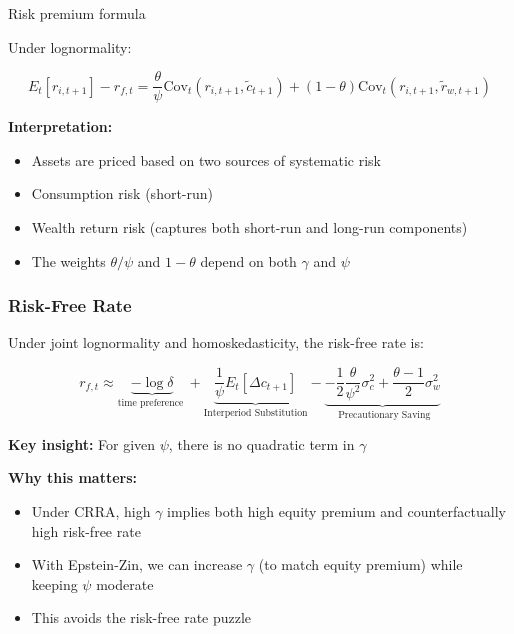 \documentclass{beamer}
\begin{document}
\begin{frame}{Risk premium formula}
    
    Under lognormality:
    \begin{tcolorbox}[colback=red!5!white, colframe=red!75!black]
        \begin{equation*}
        E_t[r_{i,t+1}] - r_{f,t} = \frac{\theta}{\psi} \text{Cov}_t(r_{i,t+1}, \tilde{c}_{t+1}) + (1-\theta) \text{Cov}_t(r_{i,t+1}, \tilde{r}_{w,t+1})
    \end{equation*}
    \end{tcolorbox}
    
 
    \textbf{Interpretation:}
    \begin{itemize}
        \item Assets are priced based on two sources of systematic risk
        \item Consumption risk (short-run)
        \item Wealth return risk (captures both short-run and long-run components)
        \item The weights $\theta/\psi$ and $1-\theta$ depend on both $\gamma$ and $\psi$
    \end{itemize}
\end{frame}


\begin{frame}
    \frametitle{Risk-Free Rate}
    
    Under joint lognormality and homoskedasticity, the risk-free rate is:
    \begin{tcolorbox}[colback=blue!5!white, colframe=blue!75!black]
    \begin{equation*}
        r_{f, t} \approx \underbrace{-\log \delta}_{\text {time preference }}+\underbrace{\frac{1}{\psi} E_t\left[\Delta c_{t+1}\right]}_{\text {Interperiod Substitution}}-\underbrace{- \frac{1}{2} \frac{\theta}{\psi^2} \sigma_c^2 + \frac{\theta-1}{2} \sigma_w^2}_{\text{ Precautionary Saving}}
    \end{equation*}
    \end{tcolorbox}
    
    \textbf{Key insight:} For given $\psi$, there is no quadratic term in $\gamma$
    
    \textbf{Why this matters:}
    \begin{itemize}
        \item Under CRRA, high $\gamma$ implies both high equity premium and counterfactually high risk-free rate
        
        \item With Epstein-Zin, we can increase $\gamma$ (to match equity premium) while keeping $\psi$ moderate
        
        \item This avoids the risk-free rate puzzle
    \end{itemize}
\end{frame}
\end{document}
